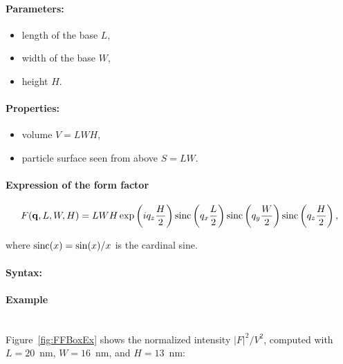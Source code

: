 \FloatBarrier

\paragraph{Parameters:}
\begin{itemize}
\item length of the base $L$,
\item width of the base $W$,
\item height  $H$.
\end{itemize}

\paragraph{Properties:}
\begin{itemize}
\item volume $V= LWH$,
\item particle surface seen from above $S = LW$.
\end{itemize}

\paragraph{Expression of the form factor}
\begin{equation*}
F(\mathbf{q},L,W,H)= L W H\exp\left(i q_z \frac{H}{2}\right) \operatorname{sinc}\left(q_x \frac{L}{2}\right)
\operatorname{sinc}\left(q_y \frac{W}{2}\right) \operatorname{sinc}\left(q_z \frac{H}{2}\right),
\end{equation*}
   
where $\operatorname{sinc}(x)=\sin(x)/x$ is the cardinal sine.

\paragraph{Syntax:} 

\newpage

\paragraph{Example}\mbox{}\\
Figure~\ref{fig:FFBoxEx} shows the normalized intensity
$|F|^2/V^2$, computed with $L=20$~nm, $W=16$~nm, and $H=13$~nm:

